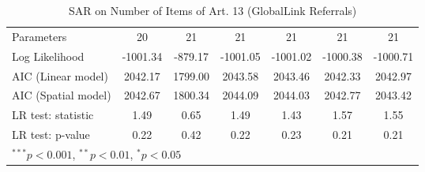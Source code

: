 \begin{table}[!h]
\begin{center}
\begin{tabular}{l c c c c c c }
Parameters              & 20           & 21           & 21           & 21           & 21           & 21           \\
Log Likelihood          & -1001.34     & -879.17      & -1001.05     & -1001.02     & -1000.38     & -1000.71     \\
AIC (Linear model)      & 2042.17      & 1799.00      & 2043.58      & 2043.46      & 2042.33      & 2042.97      \\
AIC (Spatial model)     & 2042.67      & 1800.34      & 2044.09      & 2044.03      & 2042.77      & 2043.42      \\
LR test: statistic      & 1.49         & 0.65         & 1.49         & 1.43         & 1.57         & 1.55         \\
LR test: p-value        & 0.22         & 0.42         & 0.22         & 0.23         & 0.21         & 0.21         \\
\bottomrule
\multicolumn{7}{l}{\scriptsize{$^{***}p<0.001$, $^{**}p<0.01$, $^*p<0.05$}}
\end{tabular}
\caption{SAR on Number of Items of Art. 13 (GlobalLink Referrals)}
\label{table:coefficients}
\end{center}
\end{table}
